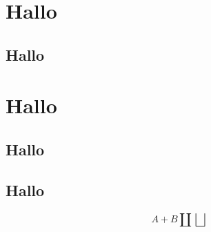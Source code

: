 \documentclass{article}
\begin{document}
\section{Hallo}

\subsection{Hallo}

\section{Hallo}

\subsection{Hallo}

\subsection{Hallo}

$$
A+B\coprod\bigsqcup
$$

%
\end{document}
